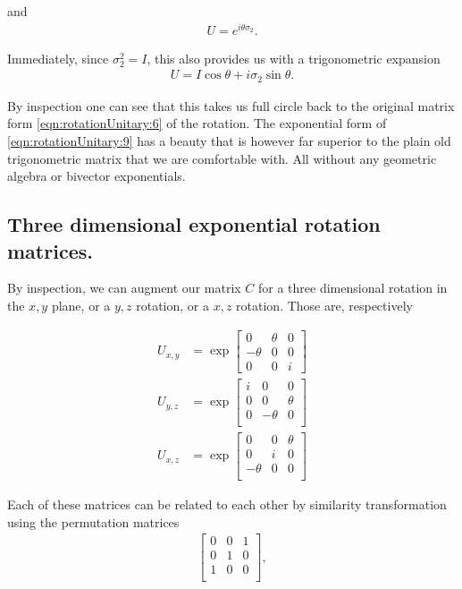 and
\begin{align}\label{eqn:rotationUnitary:9}
U = e^{i \theta \sigma_2}.
\end{align}

Immediately, since $\sigma_2^2 = I$, this also provides us with a trigonometric expansion
\begin{align}\label{eqn:rotationUnitary:10}
U = I \cos\theta + i \sigma_2 \sin\theta.
\end{align}

By inspection one can see that this takes us full circle back to the original matrix form \ref{eqn:rotationUnitary:6} of the rotation.  The exponential form of
\ref{eqn:rotationUnitary:9} has a beauty that is however far superior to the plain old trigonometric matrix that we are comfortable with.  All without any geometric algebra or bivector exponentials.

\subsection{Three dimensional exponential rotation matrices.}

By inspection, we can augment our matrix $C$ for a three dimensional rotation in the $x,y$ plane, or a $y,z$ rotation, or a $x,z$ rotation.  Those are, respectively

\begin{align}\label{eqn:rotationUnitary:30}
U_{x,y}
&=
\exp
\begin{bmatrix}
0 & \theta & 0 \\
-\theta & 0 & 0 \\
0 & 0 & i
\end{bmatrix} \\
U_{y,z}
&=
\exp
\begin{bmatrix}
i & 0 & 0 \\
0 & 0 & \theta \\
0 & -\theta & 0 \\
\end{bmatrix} \\
U_{x,z}
&=
\exp
\begin{bmatrix}
0 & 0 & \theta \\
0 & i & 0 \\
-\theta & 0 & 0 \\
\end{bmatrix}
\end{align}

Each of these matrices can be related to each other by similarity transformation using the permutation matrices
\begin{align*}
\begin{bmatrix}
0 & 0 & 1 \\
0 & 1 & 0 \\
1 & 0 & 0 \\
\end{bmatrix},
\end{align*}


